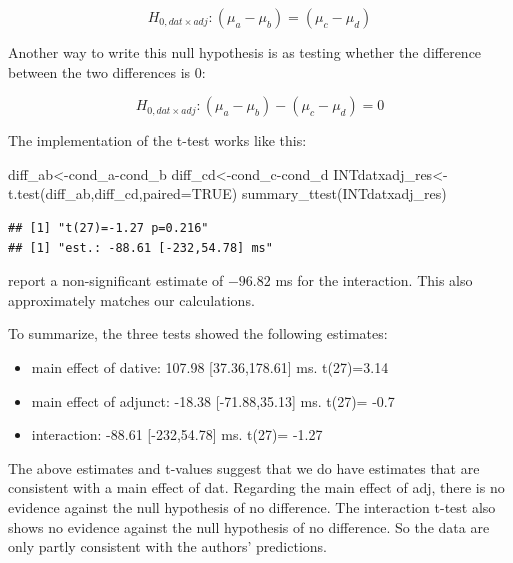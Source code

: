 \documentclass[
  12pt,
]{krantz}
\newenvironment{Shaded}{\begin{snugshade}}{\end{snugshade}}
\newcommand{\AttributeTok}[1]{\textcolor[rgb]{0.77,0.63,0.00}{#1}}
\newcommand{\ConstantTok}[1]{\textcolor[rgb]{0.00,0.00,0.00}{#1}}
\newcommand{\FunctionTok}[1]{\textcolor[rgb]{0.00,0.00,0.00}{#1}}
\newcommand{\NormalTok}[1]{#1}
\newcommand{\OtherTok}[1]{\textcolor[rgb]{0.56,0.35,0.01}{#1}}
\newcommand{\SpecialCharTok}[1]{\textcolor[rgb]{0.00,0.00,0.00}{#1}}
\providecommand{\tightlist}{%
  \setlength{\itemsep}{0pt}\setlength{\parskip}{0pt}}
\theoremstyle{definition}
\theoremstyle{definition}
\theoremstyle{definition}
\theoremstyle{definition}
\theoremstyle{remark}
\begin{document}
\begin{equation}
H_{0,dat\times adj}: (\mu_a - \mu_b) = (\mu_c - \mu_d)
\end{equation}

Another way to write this null hypothesis is as testing whether the difference between the two differences is 0:

\begin{equation}
H_{0,dat\times adj}: (\mu_a - \mu_b) - (\mu_c - \mu_d) = 0
\end{equation}

The implementation of the t-test works like this:

\begin{Shaded}
\begin{Highlighting}[]
\NormalTok{diff\_ab}\OtherTok{\textless{}{-}}\NormalTok{cond\_a}\SpecialCharTok{{-}}\NormalTok{cond\_b}
\NormalTok{diff\_cd}\OtherTok{\textless{}{-}}\NormalTok{cond\_c}\SpecialCharTok{{-}}\NormalTok{cond\_d}
\NormalTok{INTdatxadj\_res}\OtherTok{\textless{}{-}}\FunctionTok{t.test}\NormalTok{(diff\_ab,diff\_cd,}\AttributeTok{paired=}\ConstantTok{TRUE}\NormalTok{)}
\FunctionTok{summary\_ttest}\NormalTok{(INTdatxadj\_res)}
\end{Highlighting}
\end{Shaded}

\begin{verbatim}
## [1] "t(27)=-1.27 p=0.216"
## [1] "est.: -88.61 [-232,54.78] ms"
\end{verbatim}

\citet{levy2013expectation} report a non-significant estimate of \(-96.82\) ms for the interaction. This also approximately matches our calculations.

To summarize, the three tests showed the following estimates:

\begin{itemize}
\tightlist
\item
  main effect of dative: 107.98 {[}37.36,178.61{]} ms. t(27)=3.14
\item
  main effect of adjunct: -18.38 {[}-71.88,35.13{]} ms. t(27)= -0.7
\item
  interaction: -88.61 {[}-232,54.78{]} ms. t(27)= -1.27
\end{itemize}

The above estimates and t-values suggest that we do have estimates that are consistent with a main effect of dat. Regarding the main effect of adj, there is no evidence against the null hypothesis of no difference.
The interaction t-test also shows no evidence against the null hypothesis of no difference. So the data are only partly consistent with the authors' predictions.
\end{document}
